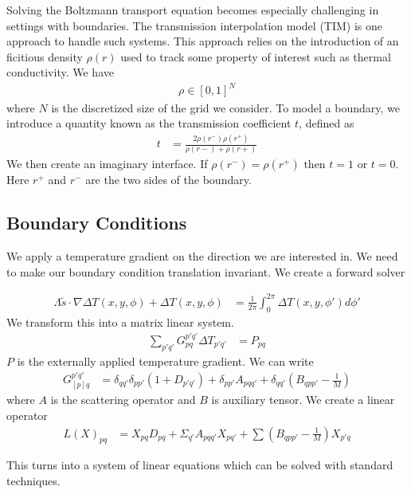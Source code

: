 \documentclass[book.tex]{subfiles}
\begin{document}
Solving the Boltzmann transport equation becomes especially challenging in settings with boundaries. The transmission interpolation model (TIM) is one approach to handle such systems. This approach relies on the introduction of an ficitious density $\rho(r)$ used to track some property of interest such as thermal conductivity. We have
\begin{align}
    \rho \in [0, 1]^N
\end{align}
where $N$ is the discretized size of the grid we consider. To model a boundary, we introduce a quantity known as the transmission coefficient $t$, defined as
\begin{align}
    t &= \frac{2 \rho(r^-) \rho(r^+)}{\rho(r-) + \rho(r+)}
\end{align}
We then create an imaginary interface. If $\rho(r^-) = \rho(r^+)$ then $t=1$ or $t=0$. Here $r^+$ and $r^-$ are the two sides of the boundary. %

\subsection{Boundary Conditions}

We apply a temperature gradient on the direction we are interested in. We need to make our boundary condition translation invariant. We create a forward solver

\begin{align}
\Lambda \tilde{s} \cdot \nabla \Delta T(x,y, \phi) + \Delta T(x, y,\phi) &= \frac{1}{2\pi} \int_0^{2\pi} \Delta T(x, y, \phi') d\phi'
\end{align}
We transform this into a matrix linear system.
\begin{align}
    \sum_{p'q'} G^{p'q'}_{p q} \Delta T_{p' q'} &= P_{pq}
\end{align}
$P$ is the externally applied temperature gradient. We can write
\begin{align}
    G^{p' q'}_{[p] q} &= \delta_{q q'} \delta_{p p'} (1 + D_{p' q'} ) + \delta_{p p'} A_{p q q'} + \delta_{q q'} (B_{qp p'} - \frac{1}{M})
\end{align}
where $A$ is the scattering operator and $B$ is auxiliary tensor. We create a linear operator
\begin{align}
    L(X)_{p q} &= X_{p q}D_{p q} + \Sigma_{q'} A_{p q q'}X_{p q' } + \sum (B_{q p p'}-\frac{1}{M})X_{p'q}
\end{align}

This turns into a system of linear equations which can be solved with standard techniques. %
\end{document}
